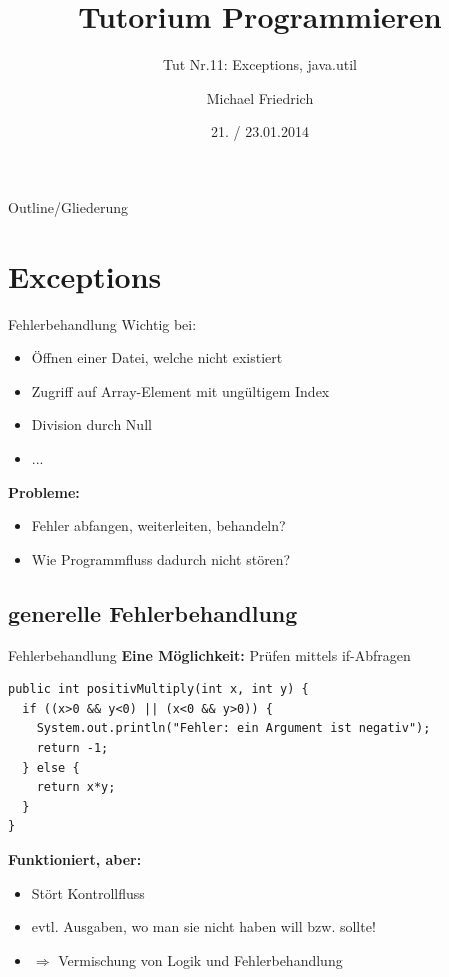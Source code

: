 \documentclass[18pt]{beamer}
\title[Prog Tut Nr. 11]{Tutorium Programmieren}
\subtitle{Tut Nr.11: Exceptions, java.util}
\author{Michael Friedrich}
\date{21. / 23.01.2014}
\institute{Institut f\"ur theoretische Informatik}
\begin{document}

\begin{frame}
	\titlepage
\end{frame}

\begin{frame}{Outline/Gliederung}
  \tableofcontents
\end{frame}

\section{Exceptions}
\begin{frame}{Fehlerbehandlung}
Wichtig bei:
\begin{itemize}
	\item Öffnen einer Datei, welche nicht existiert
  \item Zugriff auf Array-Element mit ungültigem Index
  \item Division durch Null
  \item ...
\end{itemize}
\pause
\textbf{Probleme:}
\begin{itemize}
	\item Fehler abfangen, weiterleiten, behandeln?
  \item Wie Programmfluss dadurch nicht stören?
\end{itemize}
\end{frame}

\subsection{generelle Fehlerbehandlung}
\begin{frame}[fragile]{Fehlerbehandlung}
	\textbf{Eine Möglichkeit:} Prüfen mittels if-Abfragen
  \begin{lstlisting}
public int positivMultiply(int x, int y) {
  if ((x>0 && y<0) || (x<0 && y>0)) {
    System.out.println("Fehler: ein Argument ist negativ");
    return -1;
  } else {
    return x*y;
  }
}
  \end{lstlisting}
  \pause
  \textbf{Funktioniert, aber:}
  \begin{itemize}
    \item Stört Kontrollfluss
    \item evtl. Ausgaben, wo man sie nicht haben will bzw. sollte!
    \item[] $\Rightarrow$ Vermischung von Logik und Fehlerbehandlung
  \end{itemize}
\end{frame}
\end{document}
